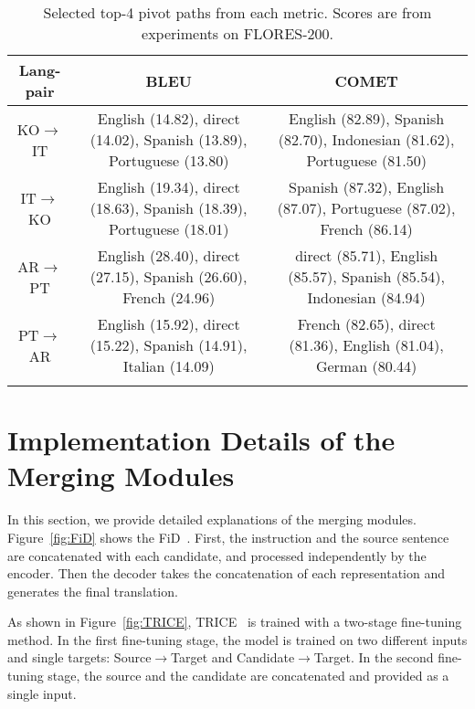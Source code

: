 \begin{table*}[!t]
\centering
\renewcommand{\arraystretch}{0.98}
\begin{adjustbox}{width=\textwidth, center}
\begin{tabular}{ccc}
\Xhline{3\arrayrulewidth}

\textbf{Lang-pair}  & \textbf{BLEU} & \textbf{COMET} \\ \hline\hline 
                  
KO$\rightarrow$IT & English (14.82), direct (14.02), Spanish (13.89), Portuguese (13.80)& English (82.89), Spanish (82.70), Indonesian (81.62), Portuguese (81.50) \\
IT$\rightarrow$KO & English (19.34), direct (18.63), Spanish (18.39), Portuguese (18.01)& Spanish (87.32), English (87.07), Portuguese (87.02), French (86.14) \\
AR$\rightarrow$PT & English (28.40), direct (27.15), Spanish (26.60), French (24.96)	 & direct (85.71), English (85.57), Spanish (85.54), Indonesian (84.94) \\
PT$\rightarrow$AR & English (15.92), direct (15.22), Spanish (14.91), Italian (14.09)	& French (82.65), direct (81.36), English (81.04), German (80.44) \\

\Xhline{3\arrayrulewidth}
\end{tabular}
\end{adjustbox}
\caption{Selected top-4 pivot paths from each metric. Scores are from experiments on FLORES-200.}
\label{tab:pivot languages from BLEU/COMET}
\end{table*}


\section{Implementation Details of the Merging Modules}
\label{apdx:Fid/TRICE illustration}

In this section, we provide detailed explanations of the merging modules.
Figure~\ref{fig:FiD} shows the FiD~\cite{fid}.
First, the instruction and the source sentence are concatenated with each candidate, and processed independently by the encoder.
Then the decoder takes the concatenation of each representation and generates the final translation.

As shown in Figure~\ref{fig:TRICE}, TRICE~\cite{trice} is trained with a two-stage fine-tuning method.
In the first fine-tuning stage, the model is trained on two different inputs and single targets: Source$\rightarrow$Target and Candidate$\rightarrow$Target.
In the second fine-tuning stage, the source and the candidate are concatenated and provided as a single input.





